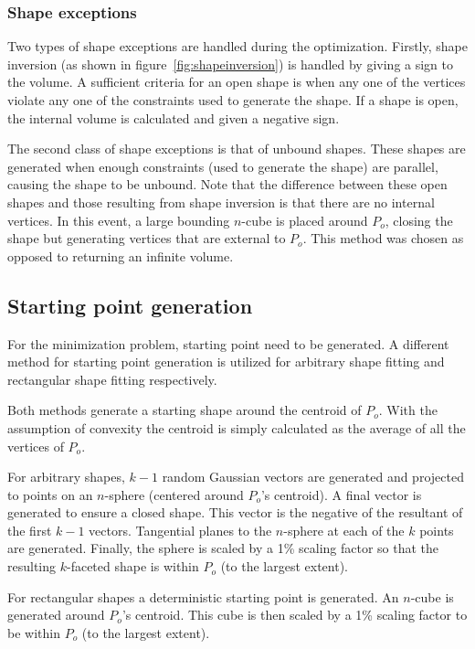 \subsubsection{Shape exceptions}
Two types of shape exceptions are handled during the optimization.
Firstly, shape inversion (as shown in figure~\ref{fig:shapeinversion}) is handled by giving a sign to the volume.
A sufficient criteria for an open shape is when any one of the vertices violate any one of the constraints used to generate the shape.
If a shape is open, the internal volume is calculated and given a negative sign.

The second class of shape exceptions is that of unbound shapes.
These shapes are generated when enough constraints (used to generate the shape) are parallel, causing the shape to be unbound.
Note that the difference between these open shapes and those resulting from shape inversion is that there are no internal vertices.
In this event, a large bounding $n$-cube is placed around $P_o$, closing the shape but generating vertices that are external to $P_o$.
This method was chosen as opposed to returning an infinite volume.

\subsection{Starting point generation}
For the minimization problem, starting point need to be generated.
A different method for starting point generation is utilized for arbitrary shape fitting and rectangular shape fitting respectively.

Both methods generate a starting shape around the centroid of $P_o$.
With the assumption of convexity the centroid is simply calculated as the average of all the vertices of $P_o$.

For arbitrary shapes, $k-1$ random Gaussian vectors are generated and projected to points on an $n$-sphere (centered around $P_o$'s centroid).
A final vector is generated to ensure a closed shape.
This vector is the negative of the resultant of the first $k-1$ vectors.
Tangential planes to the $n$-sphere at each of the $k$ points are generated.
Finally, the sphere is scaled by a 1\% scaling factor so that the resulting $k$-faceted shape is within $P_o$ (to the largest extent).

For rectangular shapes a deterministic starting point is generated.
An $n$-cube is generated around $P_o$'s centroid.
This cube is then scaled by a 1\% scaling factor to be within $P_o$ (to the largest extent).




